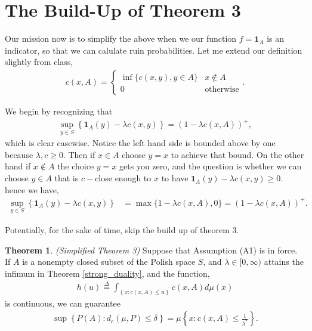 \documentclass[12pt]{article}
\newcommand{\define}{\overset{\Delta}{=}}
\theoremstyle{definition}
\newtheorem{theorem}{Theorem}
\theoremstyle{definition}
\theoremstyle{definition}
\begin{document}
\section*{The Build-Up of Theorem 3}
Our mission now is to simplify the above when we our function $f=\bm{1}_{A}$ is an indicator, so that we can calulate ruin probabilities. Let me extend our definition slightly from class,
\begin{align*}
c(x,A) = \begin{cases}
\inf\{c(x,y), y\in A\} & x\not\in A\\
0 & \text{otherwise}
\end{cases}.
\end{align*}


We begin by recognizing that
\begin{align*}
\sup_{y\in S}\left\{\bm{1}_A(y)-\lambda c(x,y)\right\}=\left(1-\lambda c(x,A)\right)^+,
\end{align*}
which is clear casewise. Notice the left hand side is bounded above by one because $\lambda,c\geq 0$. Then if $x\in A$ choose $y=x$ to achieve that bound. On the other hand if $x\not\in A$ the choice $y=x$ gets you zero, and the question is whether we can choose $y\in A$ that is $c-$close enough to $x$ to have $\bm{1}_A(y)-\lambda c(x,y)\geq 0$. hence we have,
\begin{align*}
\sup_{y\in S}\left\{\bm{1}_A(y)-\lambda c(x,y)\right\}&=\max\{1-\lambda c(x,A), 0\}=\left(1-\lambda c(x,A)\right)^+.
\end{align*}

Potentially, for the sake of time, skip the build up of theorem 3. 
\begin{theorem}\label{simplified_3} \emph{(Simplified Theorem 3)} Suppose that Assumption (A1) is in force. If $A$ is a nonempty closed subset of the Polish space $S$, and $\lambda\in[0,\infty)$ attains the infimum in Theorem \ref{strong_duality}, and the function,
\begin{align*}
h(u)\define\int_{\left\{x: c(x,A)\leq u\right\}}^{}c(x,A)d\mu(x)
\end{align*}
is continuous, we can guarantee
\begin{align*}
\sup\left\{P(A): d_c(\mu,P)\leq \delta\right\}=\mu\left\{ x: c(x,A)\leq \frac{1}{\lambda^*}\right\}.
\end{align*}
\end{theorem}

\clearpage
\end{document}
